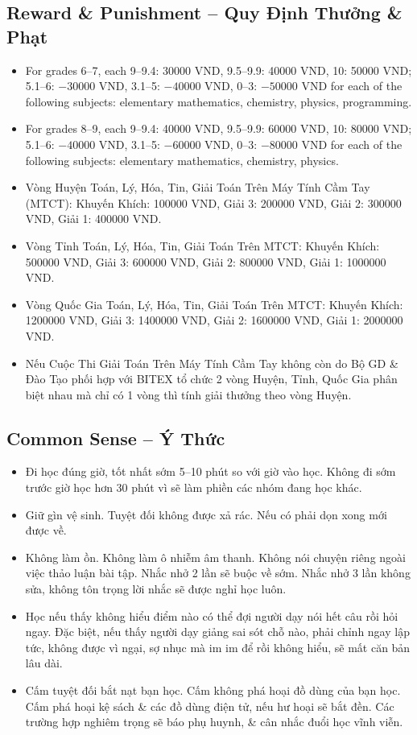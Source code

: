 \documentclass{article}
\numberwithin{equation}{section}
\begin{document}
\subsection{Reward \& Punishment -- Quy Định Thưởng \& Phạt}

\begin{itemize}\itemsep0em
	\item For grades 6--7, each 9--9.4: 30000 VND, 9.5--9.9: 40000 VND, 10: 50000 VND; 5.1--6: $-30000$ VND, 3.1--5: $-40000$ VND, 0--3: $-50000$ VND for each of the following subjects: elementary mathematics, chemistry, physics, programming.
	\item For grades 8--9, each 9--9.4: 40000 VND, 9.5--9.9: 60000 VND, 10: 80000 VND; 5.1--6: $-40000$ VND, 3.1--5: $-60000$ VND, 0--3: $-80000$ VND for each of the following subjects: elementary mathematics, chemistry, physics.
	\item Vòng Huyện Toán, Lý, Hóa, Tin, Giải Toán Trên Máy Tính Cầm Tay (MTCT): Khuyến Khích: 100000 VND, Giải 3: 200000 VND, Giải 2: 300000 VND, Giải 1: 400000 VND.
	\item Vòng Tỉnh Toán, Lý, Hóa, Tin, Giải Toán Trên MTCT: Khuyến Khích: 500000 VND, Giải 3: 600000 VND, Giải 2: 800000 VND, Giải 1: 1000000 VND.
	\item Vòng Quốc Gia Toán, Lý, Hóa, Tin, Giải Toán Trên MTCT: Khuyến Khích: 1200000 VND, Giải 3: 1400000 VND, Giải 2: 1600000 VND, Giải 1: 2000000 VND.
	\item Nếu Cuộc Thi Giải Toán Trên Máy Tính Cầm Tay không còn do Bộ GD \& Đào Tạo phối hợp với BITEX tổ chức 2 vòng Huyện, Tỉnh, Quốc Gia phân biệt nhau mà chỉ có 1 vòng thì tính giải thưởng theo vòng Huyện.
\end{itemize}

\subsection{Common Sense -- Ý Thức}

\begin{itemize}\itemsep0em
	\item Đi học đúng giờ, tốt nhất sớm 5--10 phút so với giờ vào học. Không đi sớm trước giờ học hơn 30 phút vì sẽ làm phiền các nhóm đang học khác.
	\item Giữ gìn vệ sinh. Tuyệt đối không được xả rác. Nếu có phải dọn xong mới được về.
	\item Không làm ồn. Không làm ô nhiễm âm thanh. Không nói chuyện riêng ngoài việc thảo luận bài tập. Nhắc nhở 2 lần sẽ buộc về sớm. Nhắc nhở 3 lần không sửa, không tôn trọng lời nhắc sẽ được nghỉ học luôn.
	\item Học nếu thấy không hiểu điểm nào có thể đợi người dạy nói hết câu rồi hỏi ngay. Đặc biệt, nếu thấy người dạy giảng sai sót chỗ nào, phải chỉnh ngay lập tức, không được vì ngại, sợ nhục mà im im để rồi không hiểu, sẽ mất căn bản lâu dài.
	\item Cấm tuyệt đối bắt nạt bạn học. Cấm không phá hoại đồ dùng của bạn học. Cấm phá hoại kệ sách \& các đồ dùng điện tử, nếu hư hoại sẽ bắt đền. Các trường hợp nghiêm trọng sẽ báo phụ huynh, \& cân nhắc đuổi học vĩnh viễn.
\end{itemize}
\end{document}
